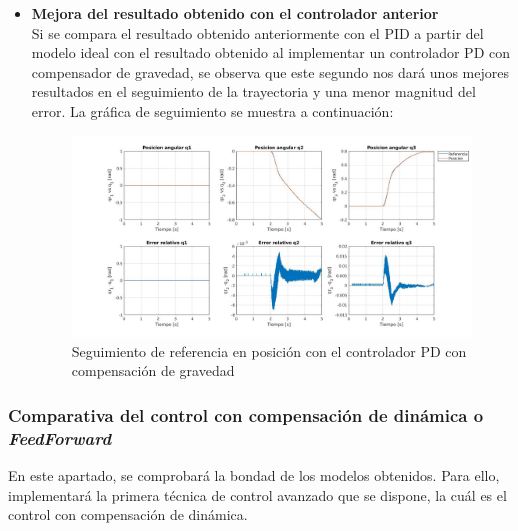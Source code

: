 \begin{itemize}

	\item \textbf{Mejora del resultado obtenido con el controlador anterior} \\

	Si se compara el resultado obtenido anteriormente con el PID a partir del modelo ideal con el resultado obtenido al implementar un controlador PD con compensador de gravedad, se observa que este segundo nos dará unos mejores resultados en el seguimiento de la trayectoria y una menor magnitud del error. La gráfica de seguimiento se muestra a continuación:



	\begin{figure}[h!]

		\centering

		\includegraphics[width=.8\textwidth]{exp2_posPDcomp}

		\caption{Seguimiento de referencia en posición con el controlador PD con compensación de gravedad}

	\end{figure}




\end{itemize}



\subsubsection{Comparativa del control con compensación de dinámica o \textit{FeedForward}}

En este apartado, se comprobará la bondad de los modelos obtenidos. Para ello, implementará la primera técnica de control avanzado que se dispone, la cuál es el control con compensación de dinámica.\\

